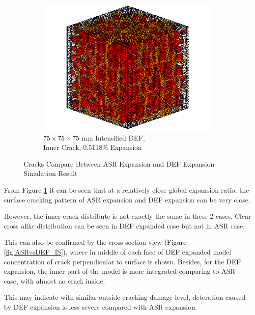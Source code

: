 \begin{figure}[ht]
\begin{subfigure}{.5\textwidth}
        \includegraphics[width=.8\linewidth]{Files/exp_3D/DEF/A30X-5C_3_c.png}
        \caption{$75 \times 75 \times 75$ mm Intensified DEF, \\Inner Crack, 0.5118\% Expansion}
        \end{subfigure}
  \caption{Cracks Compare Between ASR Expansion and DEF Expansion Simulation Result}
  \label{fig:ASRvsDEF_3Dss}
\end{figure}

From Figure \ref{fig:ASRvsDEF_3Dss} it can be seen that at a relatively close global expansion ratio, the surface cracking pattern of ASR expansion and DEF expansion can be very close.

However, the inner crack distribute is not exactly the same in these 2 cases. Clear cross alike distribution can be seen in DEF expanded case but not in ASR case.

This can also be confirmed by the cross-section view (Figure \ref{fig:ASRvsDEF_IS}), where in middle of each face of DEF expanded model concentration of crack perpendicular to surface is shown. Besides, for the DEF expansion, the inner part of the model is more integrated comparing to ASR case, with almost no crack inside.

This may indicate with similar outside cracking damage level, deteration caused by DEF expansion is less severe compared with ASR expansion.

